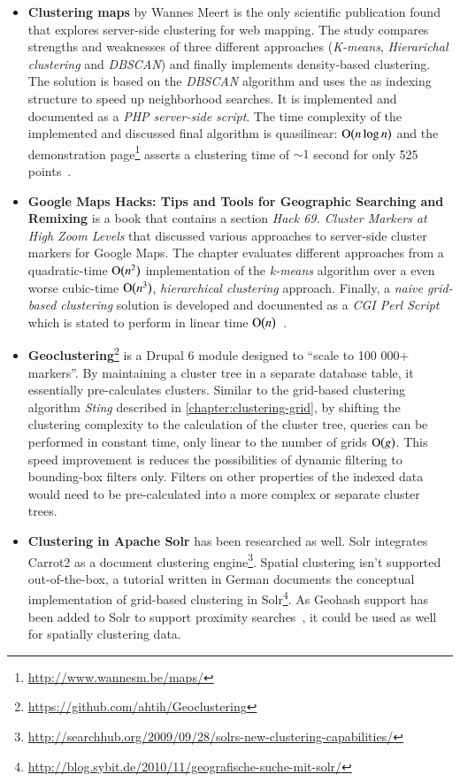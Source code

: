 \begin{itemize}

\item \textbf{Clustering maps} by Wannes Meert is the only scientific publication found that explores server-side clustering for web mapping. The study compares strengths and weaknesses of three different approaches (\textit{K-means}, \textit{Hierarichal clustering} and \textit{DBSCAN}) and finally implements density-based clustering. The solution is based on the \textit{DBSCAN} algorithm and uses the  as indexing structure to speed up neighborhood searches. It is implemented and documented as a \textit{PHP server-side script}. The time complexity of the implemented and discussed final algorithm is quasilinear: $\operatorname{O}\bigl(n \log{n}\bigr)$ and the demonstration page\footnote{\url{http://www.wannesm.be/maps/}} asserts a clustering time of $\sim 1$ second for only 525 points~\cite{Meert06clustermaps}.

\item \textbf{Google Maps Hacks: Tips and Tools for Geographic Searching and Remixing} is a book that contains a section \textit{Hack 69. Cluster Markers at High Zoom Levels} that discussed various approaches to server-side cluster markers for Google Maps. The chapter evaluates different approaches from a quadratic-time $\operatorname{O}\bigl(n^2\bigr)$ implementation of the \textit{k-means} algorithm over a even worse cubic-time $\operatorname{O}\bigl(n^3\bigr)$, \textit{hierarchical clustering} approach. Finally, a \textit{naive grid-based clustering} solution is developed and documented as a \textit{CGI Perl Script} which is stated to perform in linear time $\operatorname{O}\bigl(n\bigr)$~\cite{Gibson06Gmapshacks}.

\item \textbf{Geoclustering}\footnote{\url{https://github.com/ahtih/Geoclustering}} is a Drupal 6 module designed to ``scale to 100 000+ markers''. By maintaining a cluster tree in a separate database table, it essentially pre-calculates clusters. Similar to the grid-based clustering algorithm \textit{Sting} described in \ref{chapter:clustering-grid}, by shifting the clustering complexity to the calculation of the cluster tree, queries can be performed in constant time, only linear to the number of grids $\operatorname{O}\bigl(g\bigr)$. This speed improvement is reduces the possibilities of dynamic filtering to bounding-box filters only. Filters on other properties of the indexed data would need to be pre-calculated into a more complex or separate cluster trees.

\item \textbf{Clustering in Apache Solr} has been researched as well. Solr integrates Carrot2 as a document clustering engine\footnote{\url{http://searchhub.org/2009/09/28/solrs-new-clustering-capabilities/}}. Spatial clustering isn't supported out-of-the-box, a tutorial written in German documents the conceptual implementation of grid-based clustering in Solr\footnote{\url{http://blog.sybit.de/2010/11/geografische-suche-mit-solr/}}. As Geohash support has been added to Solr to support proximity searches~\cite{Smiley11geohash}, it could be used as well for spatially clustering data.  

\end{itemize}


